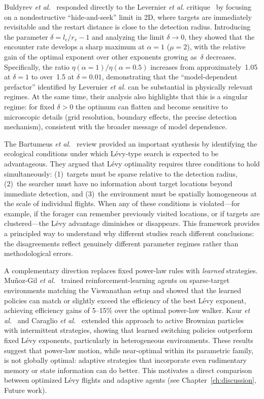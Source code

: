 Buldyrev \emph{et al.}~\cite{buldyrev2021comment} responded directly to the Levernier \emph{et al.} critique~\cite{levernier2020inverse} by focusing on a nondestructive ``hide-and-seek'' limit in 2D, where targets are immediately revisitable and the restart distance is close to the detection radius. Introducing the parameter $\delta = l_c/r_v - 1$ and analyzing the limit $\delta \to 0$, they showed that the encounter rate develops a sharp maximum at $\alpha=1$ ($\mu = 2$), with the relative gain of the optimal exponent over other exponents growing as~$\delta$ decreases. Specifically, the ratio $\eta(\alpha=1)/\eta(\alpha=0.5)$ increases from approximately~1.05 at $\delta = 1$ to over~1.5 at $\delta = 0.01$, demonstrating that the ``model-dependent prefactor'' identified by Levernier \emph{et al.} can be substantial in physically relevant regimes. At the same time, their analysis also highlights that this is a singular regime: for fixed $\delta>0$ the optimum can flatten and become sensitive to microscopic details (grid resolution, boundary effects, the precise detection mechanism), consistent with the broader message of model dependence.

The Bartumeus \emph{et al.}~\cite{bartumeus2005animal} review provided an important synthesis by identifying the ecological conditions under which L\'evy-type search is expected to be advantageous. They argued that L\'evy optimality requires three conditions to hold simultaneously: (1)~targets must be sparse relative to the detection radius, (2)~the searcher must have no information about target locations beyond immediate detection, and (3)~the environment must be spatially homogeneous at the scale of individual flights. When any of these conditions is violated---for example, if the forager can remember previously visited locations, or if targets are clustered---the L\'evy advantage diminishes or disappears. This framework provides a principled way to understand why different studies reach different conclusions: the disagreements reflect genuinely different parameter regimes rather than methodological errors.

A complementary direction replaces fixed power-law rules with \emph{learned} strategies. Mu{\~n}oz-Gil \emph{et al.}~\cite{munozgil2023optimal} trained reinforcement-learning agents on sparse-target environments matching the Viswanathan setup and showed that the learned policies can match or slightly exceed the efficiency of the best L\'evy exponent, achieving efficiency gains of 5--15\% over the optimal power-law walker. Kaur \emph{et al.}~\cite{kaur2023adaptive} and Caraglio \emph{et al.}~\cite{caraglio2024learning} extended this approach to active Brownian particles with intermittent strategies, showing that learned switching policies outperform fixed L\'evy exponents, particularly in heterogeneous environments. These results suggest that power-law motion, while near-optimal within its parametric family, is not globally optimal: adaptive strategies that incorporate even rudimentary memory or state information can do better. This motivates a direct comparison between optimized L\'evy flights and adaptive agents (see Chapter~\ref{ch:discussion}, Future work).

